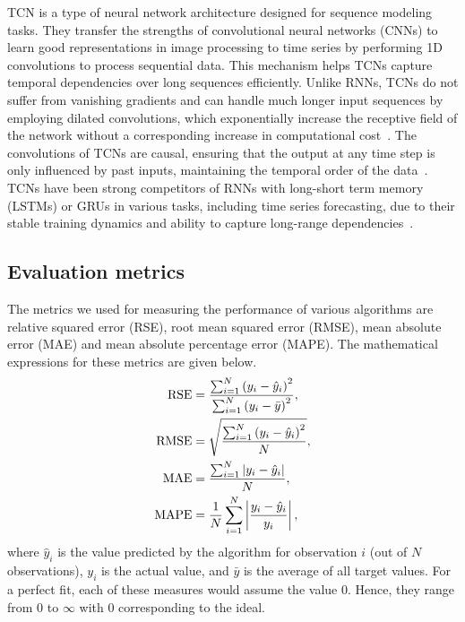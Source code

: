 TCN is a type of neural network architecture designed for sequence modeling
tasks. They transfer the strengths of convolutional neural networks (CNNs) to
learn good representations in image processing to time series by
performing 1D convolutions to process sequential data. This mechanism helps TCNs
capture temporal dependencies over long sequences efficiently. Unlike RNNs, TCNs
do not suffer from vanishing gradients and can handle much longer
input sequences by employing dilated convolutions, which
exponentially increase the receptive field of the network without a
corresponding increase in computational cost~\citep{bai2018empirical}.
The convolutions of TCNs are causal, ensuring that the output at any time
step is only influenced by past inputs, maintaining the temporal order of the
data~\citep{oord2016wavenet}. TCNs have been strong competitors of RNNs with
long-short term memory (LSTMs) or GRUs in various tasks, including time series
forecasting, due to their stable training dynamics and ability to capture
long-range dependencies~\citep{bai2018empirical}.

\subsection{Evaluation metrics}
\label{ssec:metric}

The metrics we used for measuring the performance of various algorithms are relative squared error (RSE), root mean squared error 
(RMSE), mean absolute error (MAE) and mean absolute percentage error (MAPE). The mathematical expressions for 
these metrics are given below.
%
\begin{align}
    \operatorname{RSE} &= \frac{\sum_{i=1}^N \left(y_i - \hat{y}_i\right)^2}{\sum_{i=1}^N \left(y_i - \bar{y}\right)^2}, \\
    \operatorname{RMSE} &= \sqrt{\frac{\sum_{i=1}^N \left(y_i - \hat{y}_i\right)^2}{N}}, \\
    \operatorname{MAE} &= \frac{\sum_{i=1}^N \left|{y_i - \hat{y}_i}\right|}{N}, \\
    \operatorname{MAPE} &= \frac{1}{N}\sum_{i=1}^N \left|{\frac{y_i - \hat{y}_i}{y_i}}\right|,
\end{align}
%
where $\hat{y}_i$ is the value predicted by the algorithm for observation $i$ (out of $N$ observations), $y_i$ is 
the actual value, and $\bar{y}$ is the average of all target values. For a perfect fit, each of these 
measures would assume the value $0$. Hence, they range from $0$ to $\infty$ with $0$ corresponding to 
the ideal.
